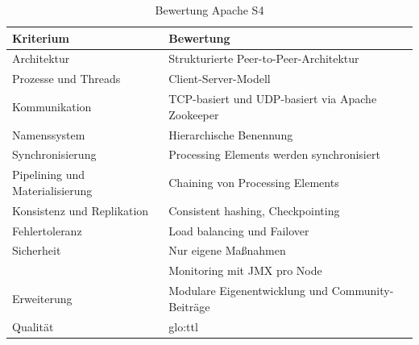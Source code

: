 \begin{table}[ht!]
	\centering
		\begin{tabular}{@{}ll@{}} \toprule
			\textbf{Kriterium} & \textbf{Bewertung} \\ \midrule
			Architektur & Strukturierte Peer-to-Peer-Architektur \\
			Prozesse und Threads & Client-Server-Modell \\
			Kommunikation & TCP-basiert und UDP-basiert via Apache Zookeeper \\
			Namenssystem & Hierarchische Benennung \\
			Synchronisierung & Processing Elements werden synchronisiert\\
			Pipelining und Materialisierung & Chaining von Processing Elements  \\
			Konsistenz und Replikation & Consistent hashing, Checkpointing \\
			Fehlertoleranz & Load balancing und Failover \\ 
			Sicherheit & Nur eigene Maßnahmen \\
			& Monitoring mit JMX pro Node \\
			Erweiterung & Modulare Eigenentwicklung und Community-Beiträge \\
			Qualität & \gls{glo:ttl} \\
			\bottomrule			
		\end{tabular}
	\caption{Bewertung Apache S4}
	\label{tab:bews4}
\end{table}
